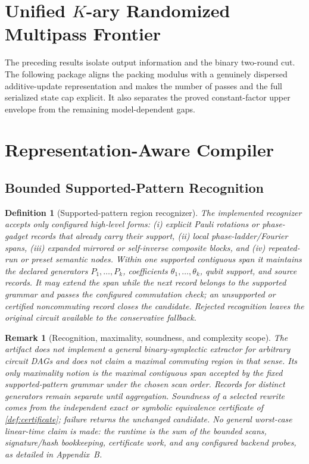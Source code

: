 \documentclass[a4paper,twocolumn,10pt,unpublished]{quantumarticle}
\newtheorem{definition}{Definition}
\newtheorem{remark}{Remark}
\begin{document}
\section{Unified $K$-ary Randomized Multipass Frontier}
\label{sec:w1-unified-frontier}

The preceding results isolate output information and the binary two-round
cut.  The following package aligns the packing modulus with a genuinely
dispersed additive-update representation and makes the number of passes
and the full serialized state cap explicit.  It also separates the proved
constant-factor upper envelope from the remaining model-dependent gaps.







\section{Representation-Aware Compiler}
\label{sec:compiler}

\subsection{Bounded Supported-Pattern Recognition}

\begin{definition}[Supported-pattern region recognizer]
\label{def:region-discovery}
The implemented recognizer accepts only configured high-level forms:
(i) explicit Pauli rotations or phase-gadget records that already carry
their support, (ii) local phase-ladder/Fourier spans, (iii) expanded
mirrored or self-inverse composite blocks, and (iv) repeated-run or preset
semantic nodes.  Within one supported contiguous span it maintains the
declared generators $P_1,\ldots,P_k$, coefficients
$\theta_1,\ldots,\theta_k$, qubit support, and source records.  It may extend
the span while the next record belongs to the supported grammar and passes
the configured commutation check; an unsupported or certified
noncommuting record closes the candidate.  Rejected recognition leaves the
original circuit available to the conservative fallback.
\end{definition}

\begin{remark}[Recognition, maximality, soundness, and complexity scope]
\label{rem:discovery-scope}
The artifact does not implement a general binary-symplectic extractor for
arbitrary circuit DAGs and does not claim a maximal commuting region in
that sense.  Its only maximality notion is the maximal contiguous span
accepted by the fixed supported-pattern grammar under the chosen scan
order.  Records for distinct generators remain separate until aggregation.
Soundness of a selected rewrite comes from the independent exact or
symbolic equivalence certificate of \cref{def:certificate}; failure returns
the unchanged candidate.  No general worst-case linear-time claim is made:
the runtime is the sum of the bounded scans, signature/hash bookkeeping,
certificate work, and any configured backend probes, as detailed in
Appendix~B.
\end{remark}
\end{document}
